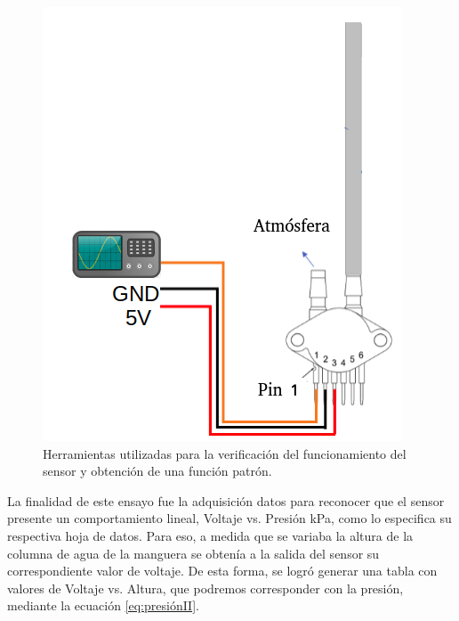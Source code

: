 \begin{figure}[htpb]
	\centering
	\includegraphics[scale=.50]{./Figures/PruebasDelSensor-FuncionPatron.png}
	\caption{Herramientas utilizadas para la verificación del funcionamiento del sensor y obtención de una función patrón. }
\label{fig:Pruebas del sensor-Funcion patron.png}
\end{figure}

La finalidad de este ensayo fue la adquisición datos para reconocer que el sensor presente un comportamiento lineal, Voltaje vs. Presión kPa, como lo especifica su respectiva hoja de datos. Para eso, a medida que se variaba	la altura de la columna de agua de la manguera se obtenía a la salida del sensor su correspondiente valor de voltaje. De esta forma, se logró generar una tabla con valores de Voltaje vs. Altura, que podremos corresponder con la presión, mediante la ecuación \ref{eq:presiónII}.
    
